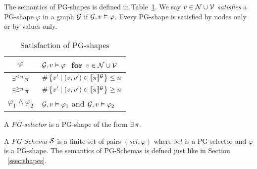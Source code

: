 The semantics of PG-shapes  is defined in Table~\ref{tab:semPGshapes}. We say $v\in\mathcal{N}\cup\mathcal{V}$ \emph{satisfies} a PG-shape $\varphi$ in a graph $\mathcal{G}$ if $\mathcal{G}, v \vDash \varphi$. Every PG-shape is satisfied by nodes only or by values only. 

\begin{table}[tb]
  \caption{Satisfaction of PG-shapes}
  \label{tab:semPGshapes}  
  \centering
  \begin{tabular}{cl}
    \toprule
    $\varphi$ & $\mathcal{G}, v \vDash\varphi\ $ for  $v\in\mathcal{N}\cup\mathcal{V}$\\
    \midrule   
    $\exists^{\leq n} \, \pi$ &
    $\#\left\{v' \mid (v, v') \in \llbracket{\pi}\rrbracket^{\mathcal{G}}\right\} \leq n$  \\[2pt]
    $\exists^{\geq n} \, \pi$ &
    $\#\left\{v' \mid (v, v') \in \llbracket{\pi}\rrbracket^{\mathcal{G}}\right\} \geq n$  \\[1pt]
    $\varphi_1 \land \varphi_2$ &
    $\mathcal{G}, v \vDash\varphi_1$ and $\mathcal{G}, v \vDash\varphi_2$ \\
    \bottomrule
  \end{tabular}
\end{table}


\begin{definition}[PG-Selectors]
A \emph{PG-selector} is a PG-shape of the form $\exists\, \pi$. 
\end{definition}



A \emph{PG-Schema} $\mathcal{S}$ is 
a finite set of pairs $(\textit{sel}, \varphi)$ where $\textit{sel}$ is a PG-selector and $\varphi$ is a PG-shape.
The semantics of PG-Schemas is defned just like in Section ~\ref{ssec:shapes}.




